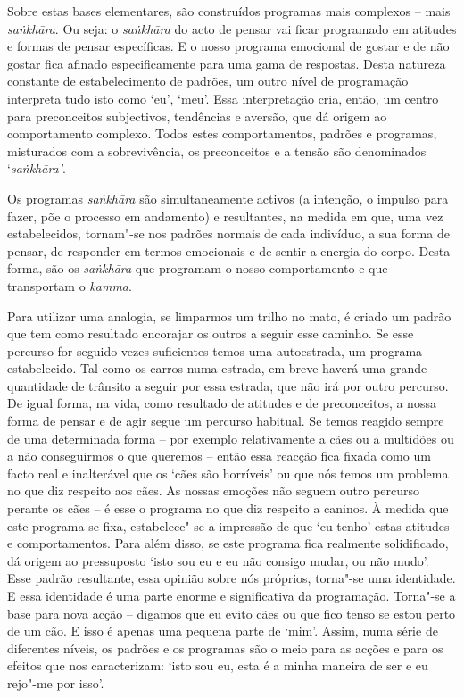 Sobre estas bases elementares, são construídos programas mais complexos -- mais
\emph{saṅkhāra}. Ou seja: o \emph{saṅkhāra} do acto de pensar vai ficar
programado em atitudes e formas de pensar específicas. E o nosso programa
emocional de gostar e de não gostar fica afinado especificamente para uma gama
de respostas. Desta natureza constante de estabelecimento de padrões, um outro
nível de programação interpreta tudo isto como `eu', `meu'. Essa interpretação
cria, então, um centro para preconceitos subjectivos, tendências e aversão, que
dá origem ao comportamento complexo. Todos estes comportamentos, padrões e
programas, misturados com a sobrevivência, os preconceitos e a tensão são
denominados `\emph{saṅkhāra'}.

Os programas \emph{saṅkhāra} são simultaneamente activos (a intenção, o impulso
para fazer, põe o processo em andamento) e resultantes, na medida em que, uma
vez estabelecidos, tornam"-se nos padrões normais de cada indivíduo, a sua forma
de pensar, de responder em termos emocionais e de sentir a energia do corpo.
Desta forma, são os \emph{saṅkhāra} que programam o nosso comportamento e que
transportam o \emph{kamma}.

Para utilizar uma analogia, se limparmos um trilho no mato, é criado um padrão
que tem como resultado encorajar os outros a seguir esse caminho. Se esse
percurso for seguido vezes suficientes temos uma autoestrada, um programa
estabelecido. Tal como os carros numa estrada, em breve haverá uma grande
quantidade de trânsito a seguir por essa estrada, que não irá por outro
percurso. De igual forma, na vida, como resultado de atitudes e de preconceitos,
a nossa forma de pensar e de agir segue um percurso habitual. Se temos reagido
sempre de uma determinada forma -- por exemplo relativamente a cães ou a
multidões ou a não conseguirmos o que queremos -- então essa reacção fica fixada
como um facto real e inalterável que os `cães são horríveis' ou que nós temos um
problema no que diz respeito aos cães. As nossas emoções não seguem outro
percurso perante os cães -- é esse o programa no que diz respeito a caninos. À
medida que este programa se fixa, estabelece"-se a impressão de que `eu tenho'
estas atitudes e comportamentos. Para além disso, se este programa fica
realmente solidificado, dá origem ao pressuposto `isto sou eu e eu não consigo
mudar, ou não mudo'. Esse padrão resultante, essa opinião sobre nós próprios,
torna"-se uma identidade. E essa identidade é uma parte enorme e significativa da
programação. Torna"-se a base para nova acção -- digamos que eu evito cães ou que
fico tenso se estou perto de um cão. E isso é apenas uma pequena parte de `mim'.
Assim, numa série de diferentes níveis, os padrões e os programas são o meio
para as acções e para os efeitos que nos caracterizam: `isto sou eu, esta é a
minha maneira de ser e eu rejo"-me por isso'.


